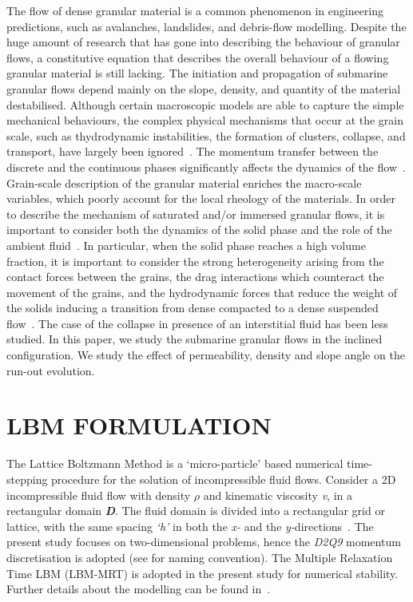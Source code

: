 \documentclass[12pt,a4paper,twocolumn,fleqn]{narms}
\begin{document}
The flow of dense granular material is a common phenomenon in engineering predictions, such as avalanches, landslides, and debris-flow modelling. Despite the huge amount of research that has gone into describing the behaviour of granular flows, a constitutive equation that describes the overall behaviour of a flowing granular material is still lacking. The initiation and propagation of submarine granular flows depend mainly on the slope, density, and quantity of the material destabilised. Although certain macroscopic models are able to capture the simple mechanical behaviours, the complex physical mechanisms that occur at the grain scale, such as thydrodynamic instabilities, the formation of clusters, collapse, and transport, have largely been ignored~. The momentum transfer between the discrete and the continuous phases significantly affects the dynamics of the flow~. Grain-scale description of the granular material enriches the macro-scale variables,  which poorly account for the local rheology of the materials.  In order to describe the mechanism of saturated and/or immersed granular flows, it is important to consider both the dynamics of the solid phase and the role of the ambient fluid~. In particular, when the solid phase reaches a high volume fraction, it is important to consider the strong heterogeneity arising from the contact forces between the grains, the drag interactions which counteract the movement of the grains, and the hydrodynamic forces that reduce the weight of the solids inducing a transition from dense compacted to a dense suspended flow~. The case of the collapse in presence of an interstitial fluid has been less studied. In this paper, we study the submarine granular flows in the inclined configuration. We study the effect of permeability, density and slope angle on the run-out evolution.

\section{LBM FORMULATION}

The Lattice Boltzmann Method is a `micro-particle' based numerical time-stepping procedure for the solution of incompressible fluid flows. Consider a 2D incompressible fluid flow with density $\rho$ and kinematic viscosity \textit{v}, in a rectangular domain \textit{\textbf{D}}. The fluid domain is divided into a rectangular grid or lattice, with the same spacing \textit{`h'} in both the \textit{x-} and the \textit{y-}directions~. The present study focuses on two-dimensional problems, hence the \textit{D2Q9} momentum discretisation is adopted (see  for naming convention). The Multiple Relaxation Time LBM (LBM-MRT) is adopted in the present study for numerical stability. Further details about the modelling can be found in~.
\end{document}
